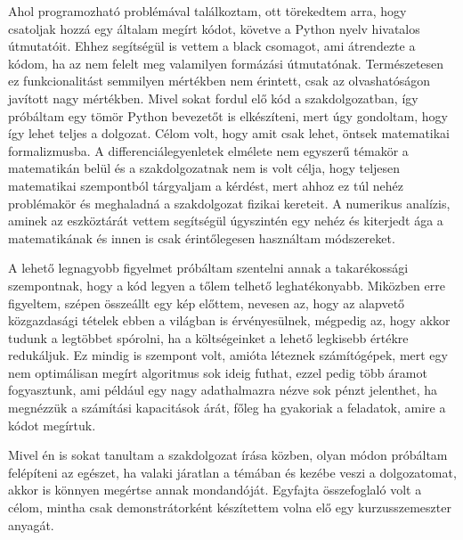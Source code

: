 \documentclass{article}
\theoremstyle{definition}
\theoremstyle{theorem}
\begin{document}
Ahol programozható problémával találkoztam, ott törekedtem arra, hogy csatoljak hozzá egy általam megírt kódot, követve a Python nyelv hivatalos útmutatóit. Ehhez segítségül is vettem a black csomagot, ami átrendezte a kódom, ha az nem felelt meg valamilyen formázási útmutatónak. Természetesen ez funkcionalitást semmilyen mértékben nem érintett, csak az olvashatóságon javított nagy mértékben. Mivel sokat fordul elő kód a szakdolgozatban, így próbáltam egy tömör Python bevezetőt is elkészíteni, mert úgy gondoltam, hogy így lehet teljes a dolgozat. Célom volt,  hogy amit csak lehet, öntsek matematikai formalizmusba.  A differenciálegyenletek elmélete nem egyszerű témakör a matematikán belül és a szakdolgozatnak nem is volt célja, hogy teljesen matematikai szempontból tárgyaljam a kérdést, mert ahhoz ez túl nehéz problémakör és meghaladná  a szakdolgozat fizikai kereteit. A numerikus analízis, aminek az eszköztárát vettem segítségül úgyszintén egy nehéz és kiterjedt ága a matematikának és innen is csak érintőlegesen használtam módszereket.

A lehető legnagyobb figyelmet próbáltam szentelni annak a takarékossági szempontnak, hogy a kód legyen a tőlem telhető leghatékonyabb. Miközben erre figyeltem, szépen összeállt egy kép előttem, nevesen az, hogy az alapvető közgazdasági tételek ebben a világban is érvényesülnek, mégpedig az, hogy akkor tudunk a legtöbbet spórolni, ha a költségeinket a lehető legkisebb értékre redukáljuk. Ez mindig is szempont volt, amióta léteznek számítógépek, mert egy nem optimálisan megírt algoritmus sok ideig futhat, ezzel pedig több áramot fogyasztunk, ami például egy nagy adathalmazra nézve sok pénzt jelenthet, ha megnézzük a számítási kapacitások árát, főleg ha gyakoriak a feladatok, amire a kódot megírtuk.

Mivel én is sokat tanultam a szakdolgozat írása közben, olyan módon próbáltam felépíteni az egészet, ha valaki járatlan a témában és kezébe veszi a dolgozatomat, akkor is könnyen megértse annak mondandóját. Egyfajta összefoglaló volt a célom, mintha csak demonstrátorként készítettem volna elő egy kurzusszemeszter anyagát.
\end{document}
